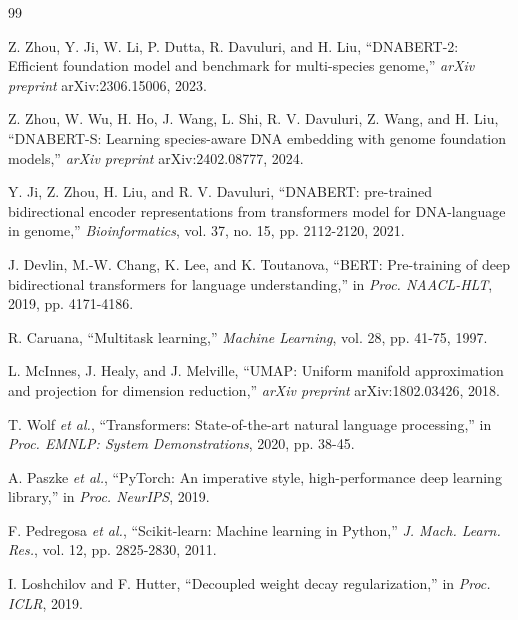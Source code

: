 \documentclass[conference]{IEEEtran}
\begin{document}
\begin{thebibliography}{99}

Z. Zhou, Y. Ji, W. Li, P. Dutta, R. Davuluri, and H. Liu,
``DNABERT-2: Efficient foundation model and benchmark for multi-species
genome,'' \emph{arXiv preprint} arXiv:2306.15006, 2023.

Z. Zhou, W. Wu, H. Ho, J. Wang, L. Shi, R. V. Davuluri, Z. Wang, and H. Liu,
``DNABERT-S: Learning species-aware DNA embedding with genome foundation
models,'' \emph{arXiv preprint} arXiv:2402.08777, 2024.

Y. Ji, Z. Zhou, H. Liu, and R. V. Davuluri,
``DNABERT: pre-trained bidirectional encoder representations from
transformers model for DNA-language in genome,''
\emph{Bioinformatics}, vol. 37, no. 15, pp. 2112-2120, 2021.

J. Devlin, M.-W. Chang, K. Lee, and K. Toutanova,
``BERT: Pre-training of deep bidirectional transformers for language
understanding,'' in \emph{Proc. NAACL-HLT}, 2019, pp. 4171-4186.

R. Caruana, ``Multitask learning,'' \emph{Machine Learning}, vol. 28,
pp. 41-75, 1997.

L. McInnes, J. Healy, and J. Melville,
``UMAP: Uniform manifold approximation and projection for dimension
reduction,'' \emph{arXiv preprint} arXiv:1802.03426, 2018.

T. Wolf \emph{et al.},
``Transformers: State-of-the-art natural language processing,'' in
\emph{Proc. EMNLP: System Demonstrations}, 2020, pp. 38-45.

A. Paszke \emph{et al.},
``PyTorch: An imperative style, high-performance deep learning library,''
in \emph{Proc. NeurIPS}, 2019.

F. Pedregosa \emph{et al.},
``Scikit-learn: Machine learning in Python,''
\emph{J. Mach. Learn. Res.}, vol. 12, pp. 2825-2830, 2011.

I. Loshchilov and F. Hutter,
``Decoupled weight decay regularization,'' in \emph{Proc. ICLR}, 2019.

\end{thebibliography}
\end{document}
